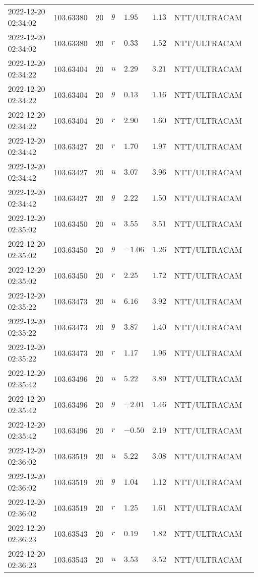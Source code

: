 \documentclass{nature_plusfigure}
\begin{document}
\begin{supplement}
\begin{center}
\begin{longtable}{llllllll}
2022-12-20 02:34:02 & 103.63380 & 20 & $g$ & $1.95$ & $1.13$ & NTT/ULTRACAM &  \\ 
2022-12-20 02:34:02 & 103.63380 & 20 & $r$ & $0.33$ & $1.52$ & NTT/ULTRACAM &  \\ 
2022-12-20 02:34:22 & 103.63404 & 20 & $u$ & $2.29$ & $3.21$ & NTT/ULTRACAM &  \\ 
2022-12-20 02:34:22 & 103.63404 & 20 & $g$ & $0.13$ & $1.16$ & NTT/ULTRACAM &  \\ 
2022-12-20 02:34:22 & 103.63404 & 20 & $r$ & $2.90$ & $1.60$ & NTT/ULTRACAM &  \\ 
2022-12-20 02:34:42 & 103.63427 & 20 & $r$ & $1.70$ & $1.97$ & NTT/ULTRACAM &  \\ 
2022-12-20 02:34:42 & 103.63427 & 20 & $u$ & $3.07$ & $3.96$ & NTT/ULTRACAM &  \\ 
2022-12-20 02:34:42 & 103.63427 & 20 & $g$ & $2.22$ & $1.50$ & NTT/ULTRACAM &  \\ 
2022-12-20 02:35:02 & 103.63450 & 20 & $u$ & $3.55$ & $3.51$ & NTT/ULTRACAM &  \\ 
2022-12-20 02:35:02 & 103.63450 & 20 & $g$ & $-1.06$ & $1.26$ & NTT/ULTRACAM &  \\ 
2022-12-20 02:35:02 & 103.63450 & 20 & $r$ & $2.25$ & $1.72$ & NTT/ULTRACAM &  \\ 
2022-12-20 02:35:22 & 103.63473 & 20 & $u$ & $6.16$ & $3.92$ & NTT/ULTRACAM &  \\ 
2022-12-20 02:35:22 & 103.63473 & 20 & $g$ & $3.87$ & $1.40$ & NTT/ULTRACAM &  \\ 
2022-12-20 02:35:22 & 103.63473 & 20 & $r$ & $1.17$ & $1.96$ & NTT/ULTRACAM &  \\ 
2022-12-20 02:35:42 & 103.63496 & 20 & $u$ & $5.22$ & $3.89$ & NTT/ULTRACAM &  \\ 
2022-12-20 02:35:42 & 103.63496 & 20 & $g$ & $-2.01$ & $1.46$ & NTT/ULTRACAM &  \\ 
2022-12-20 02:35:42 & 103.63496 & 20 & $r$ & $-0.50$ & $2.19$ & NTT/ULTRACAM &  \\ 
2022-12-20 02:36:02 & 103.63519 & 20 & $u$ & $5.22$ & $3.08$ & NTT/ULTRACAM &  \\ 
2022-12-20 02:36:02 & 103.63519 & 20 & $g$ & $1.04$ & $1.12$ & NTT/ULTRACAM &  \\ 
2022-12-20 02:36:02 & 103.63519 & 20 & $r$ & $1.25$ & $1.61$ & NTT/ULTRACAM &  \\ 
2022-12-20 02:36:23 & 103.63543 & 20 & $r$ & $0.19$ & $1.82$ & NTT/ULTRACAM &  \\ 
2022-12-20 02:36:23 & 103.63543 & 20 & $u$ & $3.53$ & $3.52$ & NTT/ULTRACAM &  \\ 

\end{longtable}
\end{center}
\end{supplement}
\end{document}
